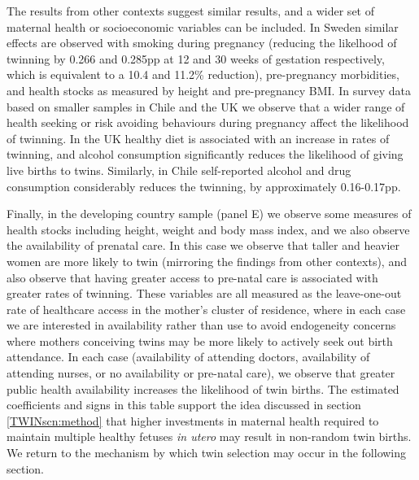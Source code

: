 \documentclass[subeqn]{article}
\begin{document}
\begin{spacing}{1.4}
The results from other contexts suggest similar results, and a wider set of
maternal health or socioeconomic variables can be included.  In Sweden similar
effects are observed with smoking during pregnancy (reducing the likelhood of
twinning by 0.266 and 0.285pp at 12 and 30 weeks of gestation respectively,
which is equivalent to a 10.4 and 11.2\% reduction), pre-pregnancy morbidities,
and health stocks as measured by height and pre-pregnancy BMI.  In survey data
based on smaller samples in Chile and the UK we observe that a wider range of
health seeking or risk avoiding behaviours during pregnancy affect the
likelihood of twinning.  In the UK healthy diet is associated with an increase
in rates of twinning, and alcohol consumption significantly reduces the
likelihood of giving live births to twins. Similarly, in Chile self-reported
alcohol and drug consumption considerably reduces the twinning, by
approximately 0.16-0.17pp.

Finally, in the developing country sample (panel E) we observe some measures of
health stocks including height, weight and body mass index, and we also observe
the availability of prenatal care.  In this case we observe that taller and
heavier women are more likely to twin (mirroring the findings from other
contexts), and also observe that having greater access to pre-natal care is
associated with greater rates of twinning.  These variables are all measured
as the leave-one-out rate of healthcare access in the mother's cluster of
residence, where in each case we are interested in availability rather than
use to avoid endogeneity concerns where mothers conceiving twins may be more
likely to actively seek out birth attendance.  In each case (availability
of attending doctors, availability of attending nurses, or no availability or
pre-natal care), we observe that greater public health availability increases
the likelihood of twin births.  The estimated coefficients and signs in this
table support the idea discussed in section \ref{TWINscn:method} that higher
investments in maternal health required to maintain multiple healthy fetuses
\emph{in utero} may result in non-random twin births. We return to the
mechanism by which twin selection may occur in the following section.


\end{spacing}
\end{document}

